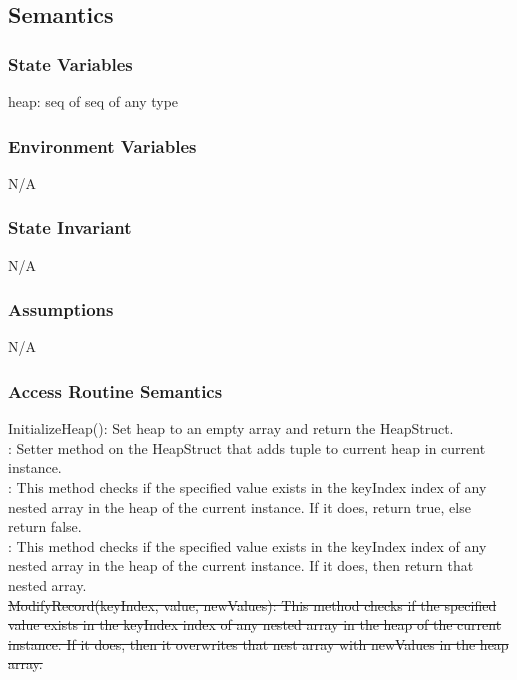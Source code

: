 \documentclass[12pt]{article}
\begin{document}
\subsection{Semantics}
\subsubsection{State Variables}
heap: seq of seq of any type

\subsubsection{Environment Variables}
N/A
\subsubsection{State Invariant}
N/A
\subsubsection{Assumptions}
N/A

\subsubsection{Access Routine Semantics}
\noindent InitializeHeap(): Set heap to an empty array and return the HeapStruct.\\

: Setter method on the HeapStruct that adds {\color{red}tuple} to current heap in current instance. \\

: This method checks if the specified value exists in the keyIndex index of any nested array in the heap of the current instance. If it does, return true, else return false.\\

: This method checks if the specified value exists in the keyIndex index of any nested array in the heap of the current instance. If it does, then return that nested array.\\

\noindent \sout{ModifyRecord(keyIndex, value, newValues): This method checks if the specified value exists in the keyIndex index of any nested array in the heap of the current instance. If it does, then it overwrites that nest array with newValues in the heap array.}\\
\end{document}

